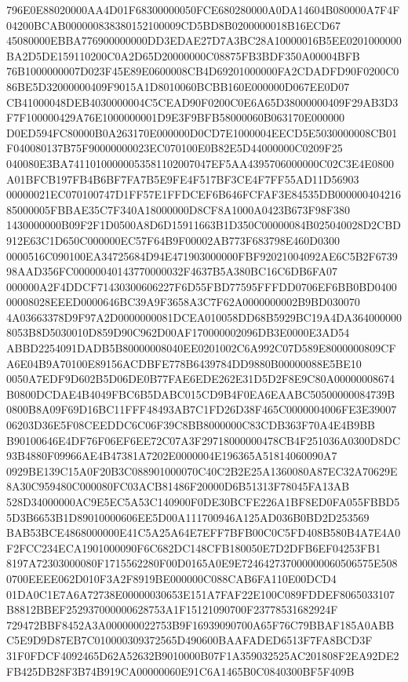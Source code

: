 \documentclass[UTF8,fontset=fandol,zihao=-4,a4paper]{ctexart}
\begin{document}
{{796E0E88020000AA4D01F68300000050FCE680280000A0DA14604B080000A7F4F04200BCAB000000838380152100009CD5BD8B0200000018B16ECD67
45080000EBBA776900000000DD3EDAE27D7A3BC28A10000016B5EE0201000000BA2D5DE159110200C0A2D65D20000000C08875FB3BDF350A00004BFB
76B1000000007D023F45E89E0600008CB4D69201000000FA2CDADFD90F0200C086BE5D32000000409F9015A1D8010060BCBB160E000000D067EE0D07
CB41000048DEB4030000004C5CEAD90F0200C0E6A65D38000000409F29AB3D3F7F100000429A76E1000000001D9E3F9BFB58000060B063170E000000
D0ED594FC80000B0A263170E000000D0CD7E1000004EECD5E5030000008CB01F040080137B75F90000000023EC070100E0B82E5D44000000C0209F25
040080E3BA74110100000053581102007047EF5AA4395706000000C02C3E4E0800A01BFCB197FB4B6BF7FA7B5E9FE4F517BF3CE4F7FF55AD11D56903
00000021EC070100747D1FF57E1FFDCEF6B646FCFAF3E84535DB00000040421685000005FBBAE35C7F340A18000000D8CF8A1000A0423B673F98F380
1430000000B09F2F1D0500A8D6D15911663B1D350C00000084B025040028D2CBD912E63C1D650C000000EC57F64B9F00002AB773F683798E460D0300
0000516C090100EA34725684D94E471903000000FBF92021004092AE6C5B2F673998AAD356FC00000040143770000032F4637B5A380BC16C6DB6FA07
000000A2F4DDCF71430300606227F6D55FBD77595FFFDD0706EF6BB0BD040000008028EEED0000646BC39A9F3658A3C7F62A0000000002B9BD030070
4A03663378D9F97A2D0000000081DCEA010058DD68B5929BC19A4DA3640000008053B8D5030010D859D90C962D00AF170000002096DB3E0000E3AD54
ABBD2254091DADB5B80000008040EE0201002C6A992C07D589E8000000809CFA6E04B9A70100E89156ACDBFE778B6439784DD9880B00000088E5BE10
0050A7EDF9D602B5D06DE0B77FAE6EDE262E31D5D2F8E9C80A00000008674B0800DCDAE4B4049FBC6B5DABC015CD9B4F0EA6EAABC50500000084739B
0800B8A09F69D16BC11FFF48493AB7C1FD26D38F465C0000004006FE3E3900706203D36E5F08CEEDDC6C06F39C8BB8000000C83CDB363F70A4E4B9BB
B90100646E4DF76F06EF6EE72C07A3F29718000000478CB4F251036A0300D8DC93B4880F09966AE4B47381A7202E0000004E196365A51814060090A7
0929BE139C15A0F20B3C088901000070C40C2B2E25A1360080A87EC32A70629E8A30C959480C000080FC03ACB81486F20000D6B51313F78045FA13AB
528D34000000AC9E5EC5A53C140900F0DE30BCFE226A1BF8ED0FA055FBBD55D3B6653B1D89010000606EE5D00A111700946A125AD036B0BD2D253569
BAB53BCE4868000000E41C5A25A64E7EFF7BFB00C0C5FD408B580B4A7E4A0F2FCC234ECA1901000090F6C682DC148CFB180050E7D2DFB6EF04253FB1
8197A72303000080F1715562280F00D0165A0E9E724642737000000060506575E5080700EEEE062D010F3A2F8919BE000000C088CAB6FA110E00DCD4
01DA0C1E7A6A72738E00000030653E151A7FAF22E100C089FDDEF8065033107B8812BBEF252937000000628753A1F15121090700F23778531682924F
729472BBF8452A3A000000022753B9F16939090700A65F76C79BBAF185A0ABBC5E9D9D87EB7C010000309372565D490600BAAFADED6513F7FA8BCD3F
31F0FDCF4092465D62A52632B9010000B07F1A359032525AC201808F2EA92DE2FB425DB28F3B74B919CA00000060E91C6A1465B0C0840300BF5F409B
}}
\end{document}
